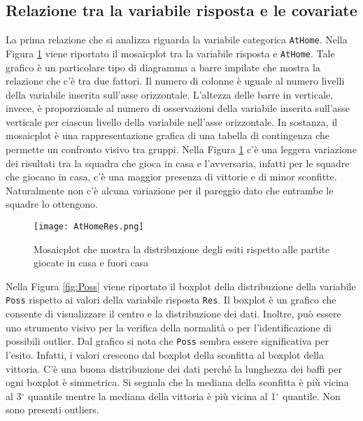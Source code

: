 \subsection{Relazione tra la variabile risposta e le covariate}

La prima relazione che si analizza riguarda la variabile categorica \texttt{AtHome}. Nella Figura \ref{fig:AtHome} viene riportato il mosaicplot tra la variabile risposta e \texttt{AtHome}. Tale grafico è un particolare tipo di diagramma a barre impilate che mostra la relazione che c'è tra due fattori. Il numero di colonne è uguale al numero livelli della variabile inserita sull'asse orizzontale. L'altezza delle barre in verticale, invece, è proporzionale al numero di osservazioni della variabile inserita sull'asse verticale per ciascun livello della variabile nell'asse orizzontale.
In sostanza, il mosaicplot è una rappresentazione grafica di una tabella di contingenza che permette un confronto visivo tra gruppi. Nella Figura \ref{fig:AtHome} c'è una leggera variazione dei risultati tra la squadra che gioca in casa e l'avversaria, infatti per le squadre che giocano in casa, c'è una maggior presenza di vittorie e di minor sconfitte. Naturalmente non c'è alcuna variazione per il pareggio dato che entrambe le squadre lo ottengono.

\begin{figure}[htbp]
	\begin{center}
		\texttt{[image: AtHomeRes.png]}
		\caption{Mosaicplot che mostra la distribuzione degli esiti rispetto alle partite giocate in casa e fuori casa} \label{fig:AtHome}
	\end{center}
\end{figure}

Nella Figura \ref{fig:Poss} viene riportato il boxplot della distribuzione della variabile \texttt{Poss} rispetto ai valori della variabile risposta \texttt{Res}. Il boxplot è un grafico che consente di visualizzare il centro e la distribuzione dei dati. Inoltre, può essere uno strumento visivo per la verifica della normalità o per l'identificazione di possibili outlier. Dal grafico si nota che \texttt{Poss} sembra essere significativa per l'esito. Infatti, i valori crescono dal boxplot della sconfitta al boxplot della vittoria. C'è una buona distribuzione dei dati perché la lunghezza dei baffi per ogni boxplot è simmetrica. Si segnala che la mediana della sconfitta è più vicina al 3$^{\circ}$ quantile mentre la mediana della vittoria è più vicina al 1$^{\circ}$ quantile. Non sono presenti outliers.\\

